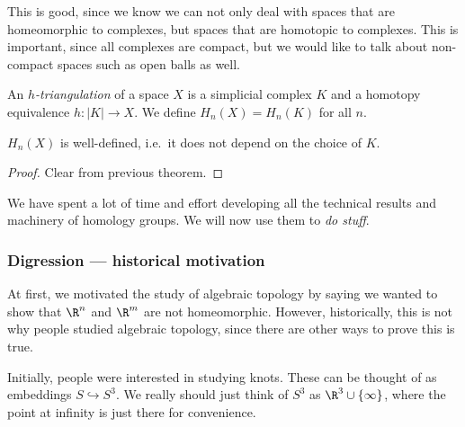 \documentclass[a4paper]{article}
\begin{document}
This is good, since we know we can not only deal with spaces that are homeomorphic to complexes, but spaces that are homotopic to complexes. This is important, since all complexes are compact, but we would like to talk about non-compact spaces such as open balls as well.

\begin{defi}
  An \emph{$h$-triangulation} of a space $X$ is a simplicial complex $K$ and a homotopy equivalence $h: |K| \to X$. We define $H_n(X) = H_n(K)$ for all $n$.
\end{defi}

\begin{lemma}
  $H_n(X)$ is well-defined, i.e.\ it does not depend on the choice of $K$.
\end{lemma}

\begin{proof}
  Clear from previous theorem.
\end{proof}

We have spent a lot of time and effort developing all the technical results and machinery of homology groups. We will now use them to \emph{do stuff}.

\subsubsection*{Digression --- historical motivation}
At first, we motivated the study of algebraic topology by saying we wanted to show that $\R^n$ and $\R^m$ are not homeomorphic. However, historically, this is not why people studied algebraic topology, since there are other ways to prove this is true.

Initially, people were interested in studying knots. These can be thought of as embeddings $S \hookrightarrow S^3$. We really should just think of $S^3$ as $\R^3 \cup \{\infty\}$, where the point at infinity is just there for convenience.
\end{document}
